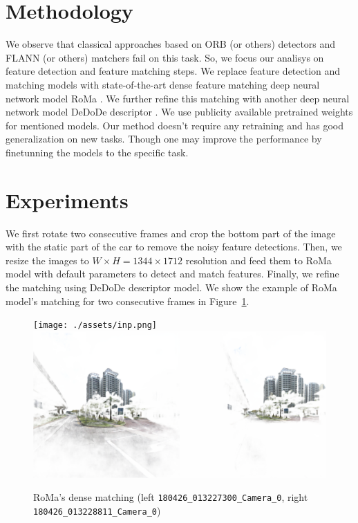\documentclass{article}
\begin{document}
\section{Methodology}

We observe that classical approaches based on ORB (or others) detectors and
FLANN (or others) matchers fail on this task. So, we focus our analisys on
feature detection and feature matching steps. We replace feature detection and
matching models with state-of-the-art dense feature matching deep neural
network model RoMa \cite{edstedt2023roma}. We further refine this matching with
another deep neural network model DeDoDe descriptor \cite{edstedt2023dedode}.
We use publicity available pretrained weights for mentioned models. Our method
doesn't require any retraining and has good generalization on new tasks. Though
one may improve the performance by finetunning the models to the specific task.

\section{Experiments}

We first rotate two consecutive frames and crop the bottom part of the image
with the static part of the car to remove the noisy feature detections. Then,
we resize the images to $W\times{}H=1344\times{}1712$ resolution and feed them
to RoMa model with default parameters to detect and match features. Finally, we
refine the matching using DeDoDe descriptor model. We show the example of RoMa
model's matching for two consecutive frames in Figure~\ref{fig:roma_kps}.

\begin{figure}
    \centering
    \texttt{[image: ./assets/inp.png]}
    \includegraphics[width=1.0\linewidth]{./assets/roma.png}
    \caption{RoMa's dense matching (left \texttt{180426\_013227300\_Camera\_0},
    right \texttt{180426\_013228811\_Camera\_0})}
    \label{fig:roma_kps}
\end{figure}
\end{document}
